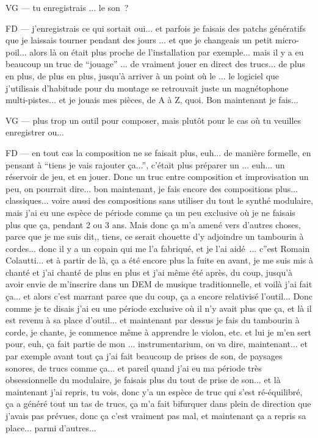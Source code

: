 VG — tu enregistrais ... le son ? 

FD — j'enregistrais ce qui sortait oui... et parfois je faisais des patchs génératifs que je laissais tourner pendant des jours ... et que je changeais un petit micro-poil... alors là on était plus proche de l'installation par exemple... mais il y a eu beaucoup un truc de ``jouage'' ... de vraiment jouer en direct des trucs... de plus en plus, de plus en plus, jusqu'à arriver à un point où le ... le logiciel que j'utilisais d'habitude pour du montage se retrouvait juste un magnétophone multi-pistes... et je jouais mes pièces, de A à Z, quoi. Bon maintenant je fais... 

VG — plus trop un outil pour composer, mais plutôt pour le cas où tu veuilles enregistrer ou... 

FD — en tout cas la composition ne se faisait plus, euh... de manière formelle, en pensant à ``tiens je vais rajouter ça...'', c'était plus préparer un ... euh... un réservoir de jeu, et en jouer. Donc un truc entre composition et improvisation un peu, on pourrait dire... bon maintenant, je fais encore des compositions plus... classiques... voire aussi des compositions sans utiliser du tout le synthé modulaire, mais j'ai eu une espèce de période comme ça un peu exclusive où je ne faisais plus que ça, pendant 2 ou 3 ans. Mais donc ça m'a amené vers d'autres choses, parce que je me suis dit,, tiens, ce serait chouette d'y adjoindre un tambourin à cordes... donc il y a un copain qui me l'a fabriqué, et je l'ai aidé ... c''est Romain Colautti... et à partir de là, ça a été encore plus la fuite en avant, je me suis mis à chanté et j'ai chanté de plus en plus et j'ai même été après, du coup, jusqu'à avoir envie de m'inscrire dans un DEM de musique traditionnelle, et voilà j'ai fait ça... et alors c'est marrant parce que du coup, ça a encore relativisé l'outil... Donc comme je te disais j'ai eu une période exclusive où il n'y avait plus que ça, et là il est revenu à sa place d'outil... et maintenant par dessus je fais du tambourin à corde, je chante, je commence même à apprendre le violon, etc. et lui je m'en sert pour, euh, ça fait partie de mon ... instrumentarium, on va dire, maintenant... et par exemple avant tout ça j'ai fait beaucoup de prises de son, de paysages sonores, de trucs comme ça... et pareil quand j'ai eu ma période très obsessionnelle du modulaire, je faisais plus du tout de prise de son... et là maintenant j'ai repris, tu vois, donc y'a un espèce de truc qui s'est ré-équilibré, ça a généré tout un tas de trucs, ça m'a fait bifurquer dans plein de direction que j'avais pas prévues, donc ça c'est vraiment pas mal, et maintenant ça a repris sa place... parmi d'autres... 

